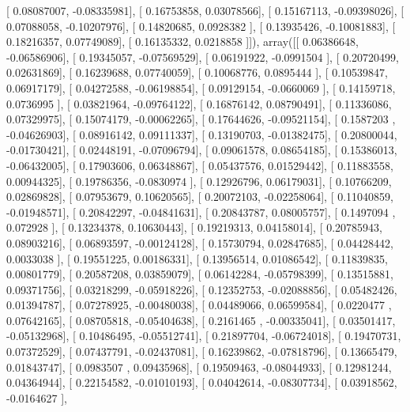 \documentclass{article}
\begin{document}
       [ 0.08087007, -0.08335981],
       [ 0.16753858,  0.03078566],
       [ 0.15167113, -0.09398026],
       [ 0.07088058, -0.10207976],
       [ 0.14820685,  0.0928382 ],
       [ 0.13935426, -0.10081883],
       [ 0.18216357,  0.07749089],
       [ 0.16135332,  0.0218858 ]]), array([[ 0.06386648, -0.06586906],
       [ 0.19345057, -0.07569529],
       [ 0.06191922, -0.0991504 ],
       [ 0.20720499,  0.02631869],
       [ 0.16239688,  0.07740059],
       [ 0.10068776,  0.0895444 ],
       [ 0.10539847,  0.06917179],
       [ 0.04272588, -0.06198854],
       [ 0.09129154, -0.0660069 ],
       [ 0.14159718,  0.0736995 ],
       [ 0.03821964, -0.09764122],
       [ 0.16876142,  0.08790491],
       [ 0.11336086,  0.07329975],
       [ 0.15074179, -0.00062265],
       [ 0.17644626, -0.09521154],
       [ 0.1587203 , -0.04626903],
       [ 0.08916142,  0.09111337],
       [ 0.13190703, -0.01382475],
       [ 0.20800044, -0.01730421],
       [ 0.02448191, -0.07096794],
       [ 0.09061578,  0.08654185],
       [ 0.15386013, -0.06432005],
       [ 0.17903606,  0.06348867],
       [ 0.05437576,  0.01529442],
       [ 0.11883558,  0.00944325],
       [ 0.19786356, -0.0830974 ],
       [ 0.12926796,  0.06179031],
       [ 0.10766209,  0.02869828],
       [ 0.07953679,  0.10620565],
       [ 0.20072103, -0.02258064],
       [ 0.11040859, -0.01948571],
       [ 0.20842297, -0.04841631],
       [ 0.20843787,  0.08005757],
       [ 0.1497094 ,  0.072928  ],
       [ 0.13234378,  0.10630443],
       [ 0.19219313,  0.04158014],
       [ 0.20785943,  0.08903216],
       [ 0.06893597, -0.00124128],
       [ 0.15730794,  0.02847685],
       [ 0.04428442,  0.0033038 ],
       [ 0.19551225,  0.00186331],
       [ 0.13956514,  0.01086542],
       [ 0.11839835,  0.00801779],
       [ 0.20587208,  0.03859079],
       [ 0.06142284, -0.05798399],
       [ 0.13515881,  0.09371756],
       [ 0.03218299, -0.05918226],
       [ 0.12352753, -0.02088856],
       [ 0.05482426,  0.01394787],
       [ 0.07278925, -0.00480038],
       [ 0.04489066,  0.06599584],
       [ 0.0220477 ,  0.07642165],
       [ 0.08705818, -0.05404638],
       [ 0.2161465 , -0.00335041],
       [ 0.03501417, -0.05132968],
       [ 0.10486495, -0.05512741],
       [ 0.21897704, -0.06724018],
       [ 0.19470731,  0.07372529],
       [ 0.07437791, -0.02437081],
       [ 0.16239862, -0.07818796],
       [ 0.13665479,  0.01843747],
       [ 0.0983507 ,  0.09435968],
       [ 0.19509463, -0.08044933],
       [ 0.12981244,  0.04364944],
       [ 0.22154582, -0.01010193],
       [ 0.04042614, -0.08307734],
       [ 0.03918562, -0.0164627 ],
\end{document}
